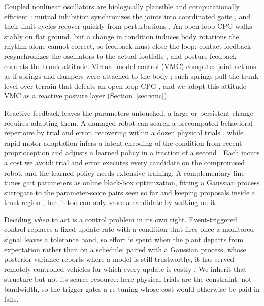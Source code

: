 \documentclass[lettersize,journal]{IEEEtran}
\begin{document}
Coupled nonlinear oscillators are biologically plausible and computationally efficient \cite{collins1994hard, ijspeert2008special}: mutual inhibition synchronizes the joints into coordinated gaits \cite{collins1994hard, sprowitz2008passive, righetti2008pattern}, and their limit cycles recover quickly from perturbations \cite{sprowitz2008passive}.
An open-loop CPG walks stably on flat ground, but a change in condition induces body rotations the rhythm alone cannot correct, so feedback must close the loop: contact feedback resynchronizes the oscillators to the actual footfalls \cite{righetti2008pattern}, and posture feedback corrects the trunk attitude.
Virtual model control (VMC) computes joint actions as if springs and dampers were attached to the body \cite{pratt2001virtual}; such springs pull the trunk level over terrain that defeats an open-loop CPG \cite{ajallooeian2013central}, and we adopt this attitude VMC as a reactive posture layer (Section~\ref{sec:vmc}).

Reactive feedback leaves the parameters untouched; a large or persistent change requires adapting them.
A damaged robot can search a precomputed behavioral repertoire by trial and error, recovering within a dozen physical trials \cite{cully2015robots}, while rapid motor adaptation infers a latent encoding of the condition from recent proprioception and adjusts a learned policy in a fraction of a second \cite{kumar2021rma}.
Each incurs a cost we avoid: trial and error executes every candidate on the compromised robot, and the learned policy needs extensive training.
A complementary line tunes gait parameters as online black-box optimization, fitting a Gaussian process surrogate to the parameter-score pairs seen so far and keeping proposals inside a trust region \cite{eriksson2019scalable}, but it too can only score a candidate by walking on it.

Deciding \emph{when} to act is a control problem in its own right.
Event-triggered control replaces a fixed update rate with a condition that fires once a monitored signal leaves a tolerance band, so effort is spent when the plant departs from expectation rather than on a schedule; paired with a Gaussian process, whose posterior variance reports where a model is still trustworthy, it has served remotely controlled vehicles for which every update is costly \cite{jang2025event}.
We inherit that structure but not its scarce resource: here physical trials are the constraint, not bandwidth, so the trigger gates a re-tuning whose cost would otherwise be paid in falls.
\end{document}
